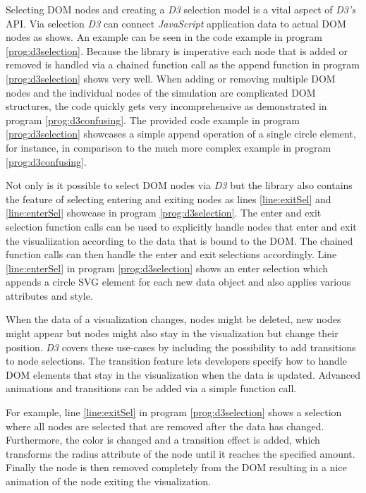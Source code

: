 Selecting DOM nodes and creating a \emph{D3} selection model is a vital aspect of \emph{D3's} API. Via selection \emph{D3} can connect \emph{JavaScript} application data to actual DOM nodes as \cite{D3Github} shows. An example can be seen in the code example in program \ref{prog:d3selection}. Because the library is imperative each node that is added or removed is handled via a chained function call as the append function in program \ref{prog:d3selection} shows very well. When adding or removing multiple DOM nodes and the individual nodes of the simulation are complicated DOM structures, the code quickly gets very incomprehensive as demonstrated in program \ref{prog:d3confusing}. The provided code example in program \ref{prog:d3selection} showcases a simple append operation of a single circle element, for instance, in comparison to the much more complex example in program \ref{prog:d3confusing}. 

Not only is it possible to select DOM nodes via \emph{D3} but the library also contains the feature of selecting entering and exiting nodes as lines \ref{line:exitSel} and \ref{line:enterSel} showcase in program \ref{prog:d3selection}. The enter and exit selection function calls can be used to explicitly handle nodes that enter and exit the visualiization according to the data that is bound to the DOM. The chained function calls can then handle the enter and exit selections accordingly. Line \ref{line:enterSel} in program \ref{prog:d3selection} shows an enter selection which appends a circle SVG element for each new data object and also applies various attributes and style.

When the data of a visualization changes, nodes might be deleted, new nodes might appear but nodes might also stay in the visualization but change their position. \emph{D3} covers these use-cases by including the possibility to add transitions to node selections. The transition feature lets developers specify how to handle DOM elements that stay in the visualization when the data is updated. Advanced animations and transitions can be added via a simple function call. 

For example, line \ref{line:exitSel} in program \ref{prog:d3selection} shows a selection where all nodes are selected that are removed after the data has changed. Furthermore, the color is changed and a transition effect is added, which transforms the radius attribute of the node until it reaches the specified amount. Finally the node is then removed completely from the DOM resulting in a nice animation of the node exiting the visualization.

